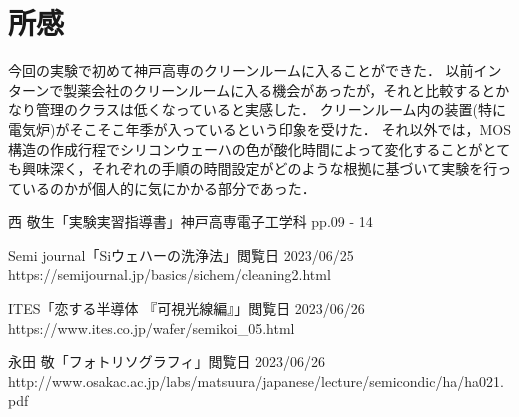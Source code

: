 \documentclass[11pt]{jarticle}
\begin{document}
\section{所感}
	今回の実験で初めて神戸高専のクリーンルームに入ることができた．
	以前インターンで製薬会社のクリーンルームに入る機会があったが，それと比較するとかなり管理のクラスは低くなっていると実感した．
	クリーンルーム内の装置(特に電気炉)がそこそこ年季が入っているという印象を受けた．
	それ以外では，MOS構造の作成行程でシリコンウェーハの色が酸化時間によって変化することがとても興味深く，それぞれの手順の時間設定がどのような根拠に基づいて実験を行っているのかが個人的に気にかかる部分であった．
\begin{thebibliography}{99}
西 敬生「実験実習指導書」神戸高専電子工学科 pp.09 - 14

Semi journal「Siウェハーの洗浄法」閲覧日 2023/06/25\\
https://semi\-journal.jp/basics/si\-chem/cleaning\-2.html

ITES「恋する半導体 『可視光線編』」閲覧日 2023/06/26\\
https://www.ites.co.jp/wafer/semikoi\_05.html

永田 敬「フォトリソグラフィ」閲覧日 2023/06/26\\
http://www.osakac.ac.jp/labs/matsuura/japanese/lecture/semicondic/ha/ha021.pdf

\end{thebibliography}
\end{document}
